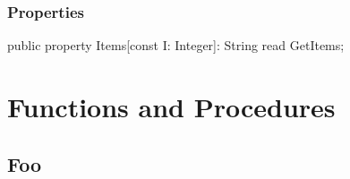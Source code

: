 \documentclass{report}
\newif\ifpdf
\begin{document}
\subsubsection*{\large{\textbf{Properties}}\normalsize\hspace{1ex}\hfill}
\begin{list}{}{
\setlength{\itemindent}{0cm}
\setlength{\listparindent}{0cm}
\setlength{\leftmargin}{\evensidemargin}
\addtolength{\leftmargin}{\tmplength}
\settowidth{\labelsep}{X}
\addtolength{\leftmargin}{\labelsep}
\setlength{\labelwidth}{\tmplength}
}
\label{ok_flag_parameter.TCastleTheme-Items}
\item[\textbf{Items}\hfill]
\ifpdf
\begin{flushleft}
\fi
\begin{ttfamily}
public property Items[const I: Integer]: String read GetItems;\end{ttfamily}

\ifpdf
\end{flushleft}
\fi


\par  \end{list}
\section{Functions and Procedures}
\ifpdf
\subsection*{\large{\textbf{Foo}}\normalsize\hspace{1ex}\hrulefill}
\else
\end{document}
